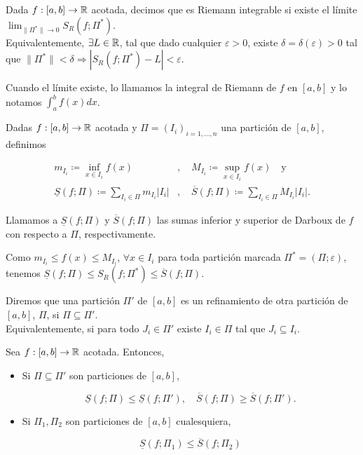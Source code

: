 
\begin{definition}
	Dada $f:[a,b]\to\mathbb{R}$ acotada, decimos que es Riemann integrable si existe el límite $\lim_{\|\Pi^*\|\to 0} S_R(f;\Pi^*)$. \\
	Equivalentemente, $\exists L\in\mathbb{R}$, tal que dado cualquier $\varepsilon>0$, existe $\delta=\delta(\varepsilon)>0$ tal que $\|\Pi^*\|<\delta\Rightarrow|S_R(f;\Pi^*)-L|<\varepsilon$.
\end{definition}

\begin{remark}
	Cuando el límite existe, lo llamamos la integral de Riemann de $f$ en $[a,b]$ y lo notamos $\int_{a}^{b} f(x) dx$.
\end{remark}

\begin{definition}
	Dadas $f:[a,b]\to\mathbb{R}$ acotada y $\Pi=(I_i)_{i=1,\dots,n}$ una partición de $[a,b]$, definimos 

	\begin{align*}
		m_{I_i}\coloneqq\inf_{x\in I_i} f(x) &,\quad M_{I_i}\coloneqq\sup_{x\in I_i} f(x) \quad \text{y} \\
		\underline{S}(f;\Pi)\coloneqq\sum_{I_i\in\Pi}^{} m_{I_i}|I_i|&,\quad \overline{S}(f;\Pi)\coloneqq\sum_{I_i\in\Pi}^{} M_{I_i}|I_i|
	.\end{align*}

	Llamamos a $\underline{S}(f;\Pi)$ y $\overline{S}(f;\Pi)$ las sumas inferior y superior de Darboux de $f$ con respecto a $\Pi$, respectivamente.
\end{definition}

\begin{note}
	Como $m_{I_i}\leq f(x)\leq M_{I_i}$, $\forall x\in I_i$ para toda partición marcada $\Pi^*=(\Pi;\varepsilon)$, tenemos $\underline{S}(f;\Pi)\leq S_R(f;\Pi^*)\leq \overline{S}(f;\Pi)$.
\end{note}

\begin{definition}[refinamiento]
	Diremos que una partición $\Pi'$ de $[a,b]$ es un refinamiento de otra partición de $[a,b]$, $\Pi$, si $\Pi\subseteq\Pi'$. \\
	Equivalentemente, si para todo $J_i\in\Pi'$ existe $I_i\in\Pi$ tal que $J_i\subseteq I_i$.
\end{definition}

\begin{prop}
	Sea $f:[a,b]\to\mathbb{R}$ acotada. Entonces,
	\begin{itemize}
		\item Si $\Pi\subseteq\Pi'$ son particiones de $[a,b]$,

		\[
		\underline{S}(f;\Pi)\leq\underline{S}(f;\Pi'),\quad\overline{S}(f;\Pi)\geq\overline{S}(f;\Pi').
		\]

		\item Si $\Pi_1,\Pi_2$ son particiones de $[a,b]$ cualesquiera,

		\[
		\underline{S}(f;\Pi_1)\leq\overline{S}(f;\Pi_2)
		\]
	\end{itemize}
\end{prop}

